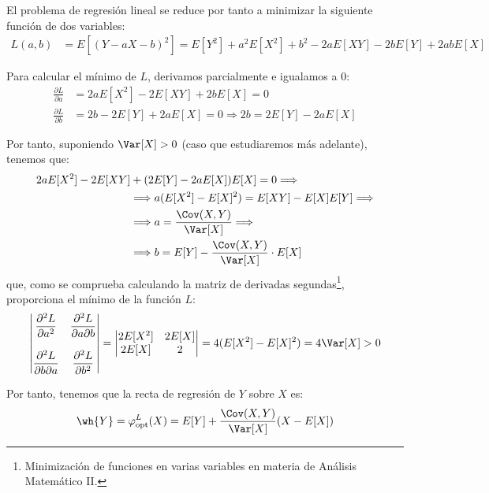 El problema de regresión lineal se reduce por tanto a minimizar la siguiente función de dos variables:
\begin{align*}
    L(a,b) &= E[(Y - aX - b)^2]
    = E[Y^2] + a^2E[X^2] + b^2 - 2aE[XY] - 2bE[Y] + 2abE[X]
\end{align*}

Para calcular el mínimo de $L$, derivamos parcialmente e igualamos a 0:
\begin{align*}
    \frac{\partial L}{\partial a} &= 2aE[X^2] - 2E[XY] + 2bE[X] = 0\\
    \frac{\partial L}{\partial b} &= 2b - 2E[Y] + 2aE[X] = 0 \Longrightarrow
    2b = 2E[Y] - 2aE[X]
\end{align*}

Por tanto, suponiendo $\Var[X]> 0$ (caso que estudiaremos más adelante), tenemos que:
\begin{align*}
    2aE[X^2] - 2E[XY] &+ (2E[Y] - 2aE[X])E[X] = 0
    \Longrightarrow  \\ &\Longrightarrow
    a(E[X^2] - E[X]^2) = E[XY] - E[X]E[Y]
    \Longrightarrow \\ &\Longrightarrow
    a = \dfrac{\Cov(X,Y)}{\Var[X]}
    \Longrightarrow  \\ &\Longrightarrow
    b = E[Y] - \dfrac{\Cov(X,Y)}{\Var[X]} \cdot E[X]
\end{align*}
que, como se comprueba calculando la matriz de derivadas segundas\footnote{Minimización de funciones en varias variables en materia de Análisis Matemático II.}, proporciona el mínimo de la función $L$:
\begin{equation*}
    \begin{vmatrix}
        \dfrac{\partial^2 L}{\partial a^2} & \dfrac{\partial^2 L}{\partial a\partial b}\\ \\
        \dfrac{\partial^2 L}{\partial b\partial a} & \dfrac{\partial^2 L}{\partial b^2}
    \end{vmatrix} =
    \begin{vmatrix}
        2E[X^2] & 2E[X]\\
        2E[X] & 2
    \end{vmatrix} = 4(E[X^2] - E[X]^2) = 4\Var[X] > 0
\end{equation*}

Por tanto, tenemos que la recta de regresión de $Y$ sobre $X$ es:
\begin{equation*}
    \wh{Y}=\varphi_{\text{opt}}^L(X) = E[Y] + \dfrac{\Cov(X,Y)}{\Var[X]}(X - E[X])
\end{equation*}

